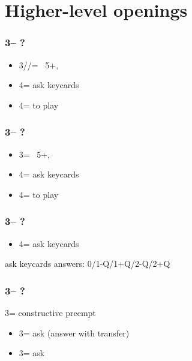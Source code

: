 \documentclass[12pt, a4paper]{report}
\begin{document}
\section*{\colorbox{blue!30}{Higher-level openings}}
 {
    \subsubsection*{3\clubs -- ?}
    \begin{itemize}
        \item 3\diams/\hearts/\spades = \nat\ 5+, \gf
        \item 4\diams = ask keycards
        \item 4\major = to play
    \end{itemize}

    \subsubsection*{3\diams -- ?}
    \begin{itemize}
        \item 3\major = \nat\ 5+, \gf
        \item 4\clubs = ask keycards
        \item 4\major = to play
    \end{itemize}

    \subsubsection*{3\major -- ?}
    \begin{itemize}
        \item 4\clubs = ask keycards
    \end{itemize}

    \vspace{0.5cm}
    ask keycards answers: 0/1-Q/1+Q/2-Q/2+Q
    \vspace{0.4cm}

    \subsubsection*{3\nt -- ?}
    3\nt = constructive \major preempt
    \begin{itemize}
        \item 3\clubs = ask (answer with transfer)
        \item 3\diams = ask
    \end{itemize}
}
\end{document}
